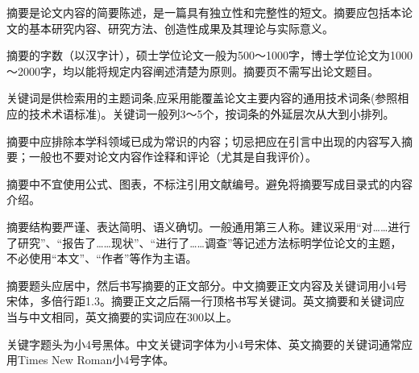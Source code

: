 \begin{cabstract}
	摘要是论文内容的简要陈述，是一篇具有独立性和完整性的短文。摘要应包括本论文的基本研究内容、研究方法、创造性成果及其理论与实际意义。
	
	摘要的字数（以汉字计），硕士学位论文一般为500～1000字，博士学位论文为1000～2000字，均以能将规定内容阐述清楚为原则。摘要页不需写出论文题目。
	
	关键词是供检索用的主题词条,应采用能覆盖论文主要内容的通用技术词条(参照相应的技术术语标准)。关键词一般列3～5个，按词条的外延层次从大到小排列。
	
	摘要中应排除本学科领域已成为常识的内容；切忌把应在引言中出现的内容写入摘要；一般也不要对论文内容作诠释和评论（尤其是自我评价）。
	
	摘要中不宜使用公式、图表，不标注引用文献编号。避免将摘要写成目录式的内容介绍。
	
	摘要结构要严谨、表达简明、语义确切。一般通用第三人称。建议采用“对……进行了研究”、“报告了……现状”、“进行了……调查”等记述方法标明学位论文的主题，不必使用“本文”、“作者”等作为主语。
	
	摘要题头应居中，然后书写摘要的正文部分。中文摘要正文内容及关键词用小4号宋体，多倍行距1.3。摘要正文之后隔一行顶格书写关键词。英文摘要和关键词应当与中文相同，英文摘要的实词应在300以上。
	
	关键字题头为小4号黑体。中文关键词字体为小4号宋体、英文摘要的关键词通常应用Times New Roman小4号字体。
	
\end{cabstract}

\begin{eabstract}
	\lipsum[1-4]
\end{eabstract}